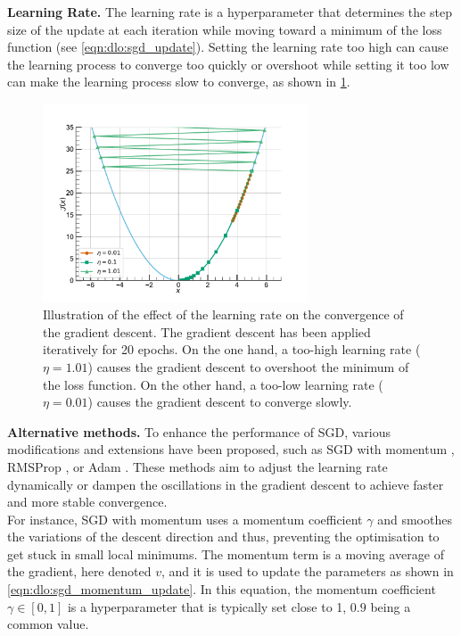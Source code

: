 \noindent \textbf{Learning Rate.} The learning rate is a hyperparameter that
determines the step size of the update at each iteration while moving toward a
minimum of the loss function (see \cref{eqn:dlo:sgd_update}). Setting the
learning rate too high can cause the learning process to converge too quickly or
overshoot while setting it too low can make the learning process slow to
converge, as shown in \cref{fig:dlo:gradient_descent}.\\

\begin{figure}[htbp]
  \centering
  \includegraphics[width=0.7\textwidth]{chapter_dlo/assets/gradient_descent.pdf}
  \caption{Illustration of the effect of the learning rate on the convergence of
    the gradient descent. The gradient descent has been applied iteratively for
    20 epochs. On the one hand, a too-high learning rate ($\eta=1.01$) causes
    the gradient descent to overshoot the minimum of the loss function. On the
    other hand, a too-low learning rate ($\eta=0.01$) causes the gradient
    descent to converge slowly.}
  \label{fig:dlo:gradient_descent}
\end{figure}

\noindent \textbf{Alternative methods.} To enhance the performance of \ac{SGD},
various modifications and extensions have been proposed, such as \ac{SGD} with
momentum \cite{sutskever2013importance,polyak1964some}, RMSProp
\cite{hinton2012neural}, or Adam \cite{kingma2014adam}. These methods aim to
adjust the learning rate dynamically or dampen the oscillations in the gradient
descent to achieve faster and more stable convergence.\\

For instance, \ac{SGD} with momentum
\cite{sutskever2013importance,polyak1964some} uses a momentum coefficient
$\gamma$ and smoothes the variations of the descent direction and thus,
preventing the optimisation to get stuck in small local minimums. The momentum
term is a moving average of the gradient, here denoted $v$, and it is used to
update the parameters as shown in \cref{eqn:dlo:sgd_momentum_update}. In this
equation, the momentum coefficient $\gamma \in [0,1]$ is a hyperparameter that
is typically set close to 1, $0.9$ being a common value.\\


